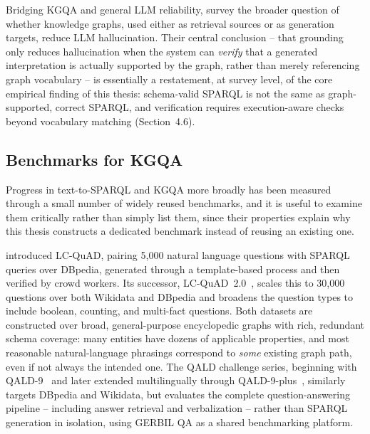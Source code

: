 \documentclass[
  12pt,
  english,
  oneside]{report}
\begin{document}
Bridging KGQA and general LLM reliability, \citet{agrawal2024knowledge}
survey the broader question of whether knowledge graphs, used either as
retrieval sources or as generation targets, reduce LLM hallucination. Their
central conclusion -- that grounding only reduces hallucination when the
system can \emph{verify} that a generated interpretation is actually
supported by the graph, rather than merely referencing graph vocabulary --
is essentially a restatement, at survey level, of the core empirical
finding of this thesis: schema-valid SPARQL is not the same as
graph-supported, correct SPARQL, and verification requires execution-aware
checks beyond vocabulary matching (Section~4.6).

\subsection{Benchmarks for KGQA}

Progress in text-to-SPARQL and KGQA more broadly has been measured through
a small number of widely reused benchmarks, and it is useful to examine
them critically rather than simply list them, since their properties
explain why this thesis constructs a dedicated benchmark instead of reusing
an existing one.

\citet{trivedi2017lcquad} introduced LC-QuAD, pairing 5{,}000 natural
language questions with SPARQL queries over DBpedia, generated through a
template-based process and then verified by crowd workers. Its successor,
LC-QuAD~2.0~\cite{dubey2019lcquad2}, scales this to 30{,}000 questions over
both Wikidata and DBpedia and broadens the question types to include
boolean, counting, and multi-fact questions. Both datasets are constructed
over broad, general-purpose encyclopedic graphs with rich, redundant
schema coverage: many entities have dozens of applicable properties, and
most reasonable natural-language phrasings correspond to \emph{some}
existing graph path, even if not always the intended one. The QALD
challenge series, beginning with QALD-9~\cite{usbeck2018qald9} and later
extended multilingually through QALD-9-plus~\cite{perevalov2022qald9plus},
similarly targets DBpedia and Wikidata, but evaluates the complete
question-answering pipeline -- including answer retrieval and
verbalization -- rather than SPARQL generation in isolation, using GERBIL
QA as a shared benchmarking platform.
\end{document}
